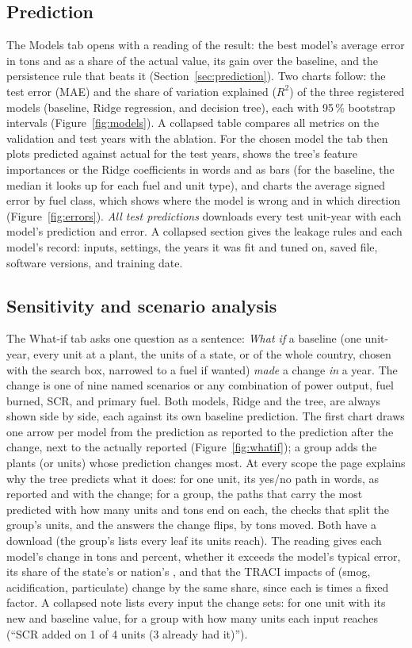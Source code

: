 \documentclass[11pt,a4paper]{article}
\begin{document}
\subsection{Prediction}

The Models tab opens with a reading of the result: the best model's average error in tons and as
a share of the actual value, its gain over the baseline, and the persistence rule that beats it
(Section~\ref{sec:prediction}). Two charts follow: the test error (MAE) and the share of
variation explained ($R^2$) of the three registered models (baseline, Ridge regression, and
decision tree), each with 95\,\% bootstrap intervals (Figure~\ref{fig:models}). A collapsed table
compares all metrics on the validation and test years with the ablation. For the chosen model the
tab then plots predicted against actual \NOx{} for the test years, shows the tree's feature
importances or the Ridge coefficients in words and as bars (for the baseline, the median it looks
up for each fuel and unit type), and charts the average signed error
by fuel class, which shows where the model is wrong and in which direction
(Figure~\ref{fig:errors}). \emph{All test predictions} downloads every test unit-year with each
model's prediction and error. A collapsed section gives the leakage rules and each model's
record: inputs, settings, the years it was fit and tuned on, saved file, software versions, and
training date.

\subsection{Sensitivity and scenario analysis}

The What-if tab asks one question as a sentence: \emph{What if} a baseline (one unit-year,
every unit at a plant, the units of a state, or of the whole country, chosen with the search box,
narrowed to a fuel if wanted) \emph{made} a change \emph{in} a year. The change is one of nine
named scenarios or any combination of power output, fuel burned, SCR, and primary fuel. Both
models, Ridge and the tree, are always shown side by side, each against its own baseline
prediction. The first chart draws one arrow per model from the prediction as reported to the
prediction after the change, next to the \NOx{} actually reported (Figure~\ref{fig:whatif}); a
group adds the plants (or units) whose prediction changes most. At every scope the page explains
why the tree predicts what it does: for one unit, its yes/no path in words, as reported and with
the change; for a group, the paths that carry the most predicted \NOx{} with how many units and
tons end on each, the checks that split the group's units, and the answers the change flips, by
tons moved. Both have a download (the group's lists every leaf its units reach).
The reading gives each model's change in tons and percent, whether it exceeds the model's typical
error, its share of the state's or nation's \NOx{}, and that the TRACI impacts of \NOx{} (smog,
acidification, particulate) change by the same share, since each is \NOx{} times a fixed factor.
A collapsed note lists every input the change sets: for one unit with its new and baseline
value, for a group with how many units each input reaches (``SCR added on 1 of 4 units (3 already
had it)'').
\end{document}
